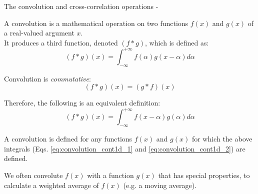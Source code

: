 %
%

\begin{frame}[t,allowframebreaks]{The convolution and cross-correlation operations -}

    A \gls{convolution} is 
    a mathematical operation on two functions $f(x)$ and $g(x)$ of a real-valued argument $x$.\\

    \vspace{0.1cm}
    It produces a third function, denoted $(f \ast g)$, which is defined as:
    \begin{equation}
        (f \ast g) (x) = 
          \int_{-\infty}^{+\infty} 
            f(\alpha) g(x-\alpha) d\alpha
        \label{eq:convolution_cont1d_1}
    \end{equation}        

    Convolution is {\em commutative}: 
    \begin{equation}
        (f \ast g) (x) = (g \ast f) (x) 
        \label{eq:convolution_commutative_1}
    \end{equation}        
    
    Therefore, the following is an equivalent definition:
    \begin{equation}
        (f \ast g) (x) = 
          \int_{-\infty}^{+\infty} 
            f(x-\alpha) g(\alpha) d\alpha
        \label{eq:convolution_cont1d_2}
    \end{equation}        

    A \gls{convolution} is defined for any functions $f(x)$ and $g(x)$ 
    for which the above integrals 
    (Eqs. \ref{eq:convolution_cont1d_1} and \ref{eq:convolution_cont1d_2}) 
    are defined.\\

    \framebreak

    We often convolute $f(x)$ with a function $g(x)$ that has special properties, 
    to calculate a weighted average of $f(x)$ (e.g. a moving average).\\


\end{frame}
